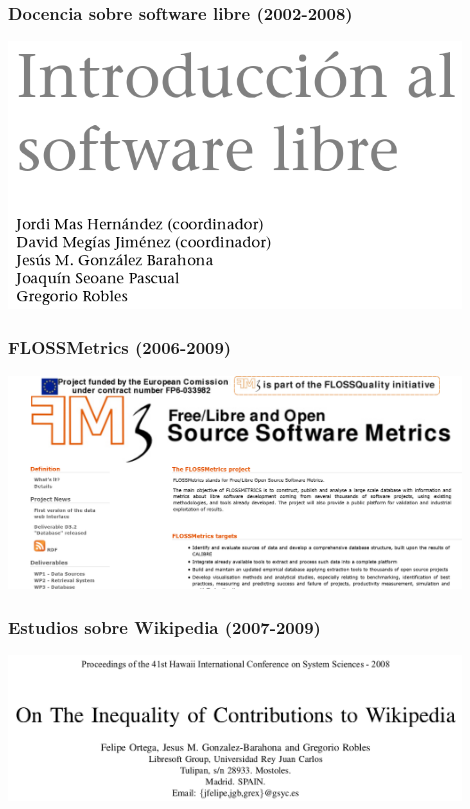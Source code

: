 \begin{frame}[fragile]
  \frametitle{Docencia sobre software libre (2002-2008)}

  \begin{center}
  \includegraphics[width=12cm]{figs/intro-sobre}
  \end{center}  
  
\end{frame}

\begin{frame}[fragile]
  \frametitle{FLOSSMetrics (2006-2009)}

  \begin{center}
  \includegraphics[width=12cm]{figs/flossmetrics}
  \end{center}  
  
\end{frame}

\begin{frame}[fragile]
  \frametitle{Estudios sobre Wikipedia (2007-2009)}

  \begin{center}
  \includegraphics[width=12cm]{figs/wikipedia}
  \end{center}  
  
\end{frame}

